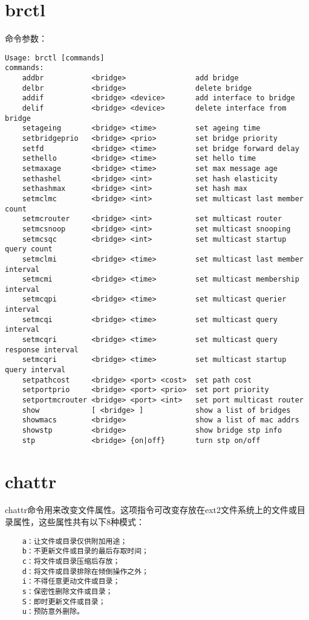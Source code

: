 \documentclass[a4paper,left=2.5cm,right=2.5cm,11pt]{article}
\begin{document}
\tableofcontents

\clearpage

\section{brctl}
	命令参数：
	\begin{lstlisting}
Usage: brctl [commands]
commands:
	addbr           <bridge>                add bridge
	delbr           <bridge>                delete bridge
	addif           <bridge> <device>       add interface to bridge
	delif           <bridge> <device>       delete interface from bridge
	setageing       <bridge> <time>         set ageing time
	setbridgeprio   <bridge> <prio>         set bridge priority
	setfd           <bridge> <time>         set bridge forward delay
	sethello        <bridge> <time>         set hello time
	setmaxage       <bridge> <time>         set max message age
	sethashel       <bridge> <int>          set hash elasticity
	sethashmax      <bridge> <int>          set hash max
	setmclmc        <bridge> <int>          set multicast last member count
	setmcrouter     <bridge> <int>          set multicast router
	setmcsnoop      <bridge> <int>          set multicast snooping
	setmcsqc        <bridge> <int>          set multicast startup query count
	setmclmi        <bridge> <time>         set multicast last member interval
	setmcmi         <bridge> <time>         set multicast membership interval
	setmcqpi        <bridge> <time>         set multicast querier interval
	setmcqi         <bridge> <time>         set multicast query interval
	setmcqri        <bridge> <time>         set multicast query response interval
	setmcqri        <bridge> <time>         set multicast startup query interval
	setpathcost     <bridge> <port> <cost>  set path cost
	setportprio     <bridge> <port> <prio>  set port priority
	setportmcrouter <bridge> <port> <int>   set port multicast router
	show            [ <bridge> ]            show a list of bridges
	showmacs        <bridge>                show a list of mac addrs
	showstp         <bridge>                show bridge stp info
	stp             <bridge> {on|off}       turn stp on/off
	\end{lstlisting}

\section{chattr}
	chattr命令用来改变文件属性。这项指令可改变存放在ext2文件系统上的文件或目录属性，这些属性共有以下8种模式：
	\begin{lstlisting}
	a：让文件或目录仅供附加用途； 
	b：不更新文件或目录的最后存取时间； 
	c：将文件或目录压缩后存放； 
	d：将文件或目录排除在倾倒操作之外； 
	i：不得任意更动文件或目录； 
	s：保密性删除文件或目录； 
	S：即时更新文件或目录； 
	u：预防意外删除。
	\end{lstlisting}
\end{document}
